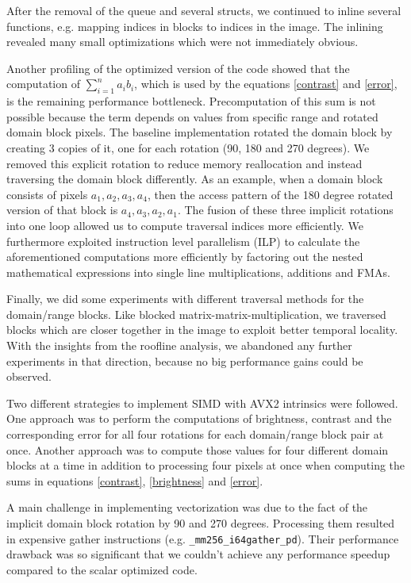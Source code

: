 After the removal of the queue and several structs, we continued to inline several functions, e.g. mapping indices in blocks
to indices in the image. The inlining revealed many small optimizations which were not immediately obvious.

Another profiling of the optimized version of the code showed that the computation of $\sum_{i=1}^n a_i b_i$, which is used by the equations
\ref{contrast} and \ref{error}, is the remaining performance bottleneck. Precomputation of this sum is not possible
because the term depends on values from specific range and rotated domain block pixels. The baseline implementation rotated
the domain block by creating 3 copies of it, one for each rotation (90, 180 and 270 degrees). We removed this explicit rotation
to reduce memory reallocation and instead traversing the domain block differently. As an example, when a domain block consists
of pixels $a_1, a_2, a_3, a_4$, then the access pattern of the 180 degree rotated version of that block is $a_4, a_3, a_2, a_1$.
The fusion of these three implicit rotations into one loop allowed us to compute traversal indices more efficiently.
We furthermore exploited instruction level parallelism (ILP) to calculate the aforementioned computations more efficiently
by factoring out the nested mathematical expressions into single line multiplications, additions and FMAs.

Finally, we did some experiments with different traversal methods for the
domain/range blocks. Like blocked matrix-matrix-multiplication, we traversed
blocks which are closer together in the image to exploit better temporal
locality. With the insights from the roofline analysis, we abandoned any further
experiments in that direction, because no big performance gains could be
observed.

 Two different strategies to implement SIMD with AVX2 intrinsics
were followed. One approach was to perform the computations of brightness,
contrast and the corresponding error for all four rotations for each
domain/range block pair at once. Another approach was to compute
those values for four different domain blocks at a time in
addition to processing four pixels at once when computing the sums in equations
\ref{contrast}, \ref{brightness} and \ref{error}.

A main challenge in implementing vectorization was due to the fact of the implicit
domain block rotation by 90 and 270 degrees. Processing them resulted in expensive
gather instructions (e.g. \verb|_mm256_i64gather_pd|). Their performance drawback was
so significant that we couldn't achieve any performance speedup compared to the scalar
optimized code.

